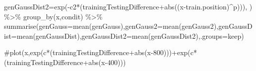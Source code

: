 \documentclass[
  letterpaper,
  DIV=11,
  numbers=noendperiod]{scrartcl}
\newenvironment{Shaded}{\begin{snugshade}}{\end{snugshade}}
\newcommand{\AttributeTok}[1]{\textcolor[rgb]{0.40,0.45,0.13}{#1}}
\newcommand{\CommentTok}[1]{\textcolor[rgb]{0.37,0.37,0.37}{#1}}
\newcommand{\FunctionTok}[1]{\textcolor[rgb]{0.28,0.35,0.67}{#1}}
\newcommand{\NormalTok}[1]{\textcolor[rgb]{0.00,0.23,0.31}{#1}}
\newcommand{\SpecialCharTok}[1]{\textcolor[rgb]{0.37,0.37,0.37}{#1}}
\newcommand{\StringTok}[1]{\textcolor[rgb]{0.13,0.47,0.30}{#1}}
\begin{document}
\begin{Shaded}
\begin{Highlighting}[]
                            \AttributeTok{genGaussDist2=}\FunctionTok{exp}\NormalTok{(}\SpecialCharTok{{-}}\NormalTok{c2}\SpecialCharTok{*}\NormalTok{(trainingTestingDifference}\SpecialCharTok{+}\FunctionTok{abs}\NormalTok{((x}\SpecialCharTok{{-}}\NormalTok{train.position)}\SpecialCharTok{\^{}}\NormalTok{p))),}
\NormalTok{                            ) }\SpecialCharTok{\%\textgreater{}\%} 
  \FunctionTok{group\_by}\NormalTok{(x,condit) }\SpecialCharTok{\%\textgreater{}\%}
  \FunctionTok{summarise}\NormalTok{(}\AttributeTok{genGauss=}\FunctionTok{mean}\NormalTok{(genGauss),}\AttributeTok{genGauss2=}\FunctionTok{mean}\NormalTok{(genGauss2),}\AttributeTok{genGaussDist=}\FunctionTok{mean}\NormalTok{(genGaussDist),}\AttributeTok{genGaussDist2=}\FunctionTok{mean}\NormalTok{(genGaussDist2),}\AttributeTok{.groups=}\StringTok{\textquotesingle{}keep\textquotesingle{}}\NormalTok{)}


\CommentTok{\#plot(x,exp(c*(trainingTestingDifference+abs(x{-}800)))+exp(c*(trainingTestingDifference+abs(x{-}400)))}


\end{Highlighting}
\end{Shaded}
\end{document}

